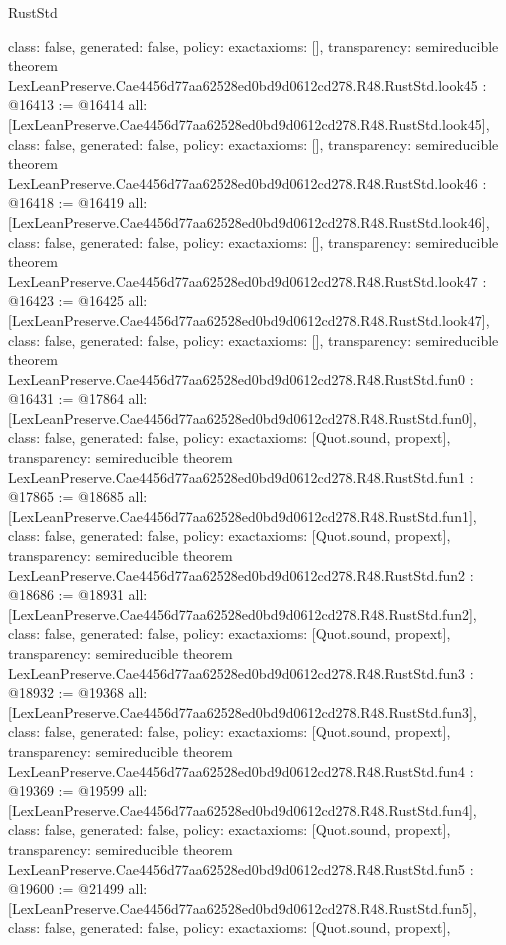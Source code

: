 \begin{lexlean}{RustStd}
\begin{coremodule}
{  class: false,
  generated: false,
  policy: exact{axioms: []},
  transparency: semireducible
}
theorem LexLeanPreserve.Cae4456d77aa62528ed0bd9d0612cd278.R48.RustStd.look45 : @16413 := @16414 {
  all: [LexLeanPreserve.Cae4456d77aa62528ed0bd9d0612cd278.R48.RustStd.look45],
  class: false,
  generated: false,
  policy: exact{axioms: []},
  transparency: semireducible
}
theorem LexLeanPreserve.Cae4456d77aa62528ed0bd9d0612cd278.R48.RustStd.look46 : @16418 := @16419 {
  all: [LexLeanPreserve.Cae4456d77aa62528ed0bd9d0612cd278.R48.RustStd.look46],
  class: false,
  generated: false,
  policy: exact{axioms: []},
  transparency: semireducible
}
theorem LexLeanPreserve.Cae4456d77aa62528ed0bd9d0612cd278.R48.RustStd.look47 : @16423 := @16425 {
  all: [LexLeanPreserve.Cae4456d77aa62528ed0bd9d0612cd278.R48.RustStd.look47],
  class: false,
  generated: false,
  policy: exact{axioms: []},
  transparency: semireducible
}
theorem LexLeanPreserve.Cae4456d77aa62528ed0bd9d0612cd278.R48.RustStd.fun0 : @16431 := @17864 {
  all: [LexLeanPreserve.Cae4456d77aa62528ed0bd9d0612cd278.R48.RustStd.fun0],
  class: false,
  generated: false,
  policy: exact{axioms: [Quot.sound, propext]},
  transparency: semireducible
}
theorem LexLeanPreserve.Cae4456d77aa62528ed0bd9d0612cd278.R48.RustStd.fun1 : @17865 := @18685 {
  all: [LexLeanPreserve.Cae4456d77aa62528ed0bd9d0612cd278.R48.RustStd.fun1],
  class: false,
  generated: false,
  policy: exact{axioms: [Quot.sound, propext]},
  transparency: semireducible
}
theorem LexLeanPreserve.Cae4456d77aa62528ed0bd9d0612cd278.R48.RustStd.fun2 : @18686 := @18931 {
  all: [LexLeanPreserve.Cae4456d77aa62528ed0bd9d0612cd278.R48.RustStd.fun2],
  class: false,
  generated: false,
  policy: exact{axioms: [Quot.sound, propext]},
  transparency: semireducible
}
theorem LexLeanPreserve.Cae4456d77aa62528ed0bd9d0612cd278.R48.RustStd.fun3 : @18932 := @19368 {
  all: [LexLeanPreserve.Cae4456d77aa62528ed0bd9d0612cd278.R48.RustStd.fun3],
  class: false,
  generated: false,
  policy: exact{axioms: [Quot.sound, propext]},
  transparency: semireducible
}
theorem LexLeanPreserve.Cae4456d77aa62528ed0bd9d0612cd278.R48.RustStd.fun4 : @19369 := @19599 {
  all: [LexLeanPreserve.Cae4456d77aa62528ed0bd9d0612cd278.R48.RustStd.fun4],
  class: false,
  generated: false,
  policy: exact{axioms: [Quot.sound, propext]},
  transparency: semireducible
}
theorem LexLeanPreserve.Cae4456d77aa62528ed0bd9d0612cd278.R48.RustStd.fun5 : @19600 := @21499 {
  all: [LexLeanPreserve.Cae4456d77aa62528ed0bd9d0612cd278.R48.RustStd.fun5],
  class: false,
  generated: false,
  policy: exact{axioms: [Quot.sound, propext]},
}
\end{coremodule}
\end{lexlean}
